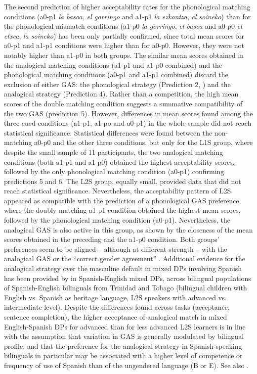 \documentclass[output=paper]{langscibook}
\begin{document}
The second prediction of higher acceptability rates for the phonological matching conditions (a0-p1 \textit{la basoa, el gorringo} and a1-p1 \textit{la ezkontza}, \textit{el soineko}) than for the phonological mismatch conditions (a1-p0 \textit{la gorringo}, \textit{el basoa} and a0-p0 \textit{el etxea}, \textit{la soineko}) has been only partially confirmed, since total mean scores for a0-p1 and a1-p1 conditions were higher than for a0-p0. However, they were not notably higher than a1-p0 in both groups. The similar mean scores obtained in the analogical matching conditions (a1-p1 and a1-p0 combined) and the phonological matching conditions (a0-p1 and a1-p1 combined) discard the exclusion of either GAS: the phonological strategy (Prediction 2, \citealt{Harris1991,TeschnerRussell1984}) and the analogical strategy (Prediction 4). Rather than a competition, the high mean scores of the double matching condition suggests a summative compatibility of the two GAS (prediction 5). However, differences in mean scores found among the three cued conditions (a1-p1, a1-po and a0-p1) in the whole sample did not reach statistical significance. Statistical differences were found between the non-matching a0-p0 and the other three conditions, but only for the L1S group, where despite the small sample of 11 participants, the two analogical matching conditions (both a1-p1 and a1-p0) obtained the highest acceptability scores, followed by the only phonological matching condition (a0-p1) confirming predictions 5 and 6. The L2S group, equally small, provided data that did not reach statistical significance. Nevertheless, the acceptability pattern of L2S appeared as compatible with the prediction of a phonological GAS preference, where the doubly matching a1-p1 condition obtained the highest mean scores, followed by the phonological matching condition (a0-p1). Nevertheless, the analogical GAS is also active in this group, as shown by the closeness of the mean scores obtained in the preceding and the a1-p0 condition. Both groups' preferences seem to be aligned – although at different strength – with the analogical GAS or the “correct gender agreement” \citep{JorschickEtAl2011}. Additional evidence for the analogical strategy over the masculine default in mixed DPs involving Spanish has been provided by \citet{LicerasFernándezFuertes2018,LicerasFernándezFuertessubmitted} in Spanish-English mixed DPs, across bilingual populations of Spanish-English bilinguals from Trinidad and Tobago (bilingual children with English vs. Spanish as heritage language, L2S speakers with advanced vs. intermediate level). Despite the differences found across tasks (acceptance, sentence completion), the higher acceptance of analogical match in mixed English-Spanish DPs for advanced than for less advanced L2S learners is in line with the assumption that variation in GAS is generally modulated by bilingual profile, and that the preference for the analogical strategy in Spanish-speaking bilinguals in particular may be associated with a higher level of competence or frequency of use of Spanish than of the ungendered language (B or E). See also \citet{ValdésKroffEtAl2017}.
\end{document}

